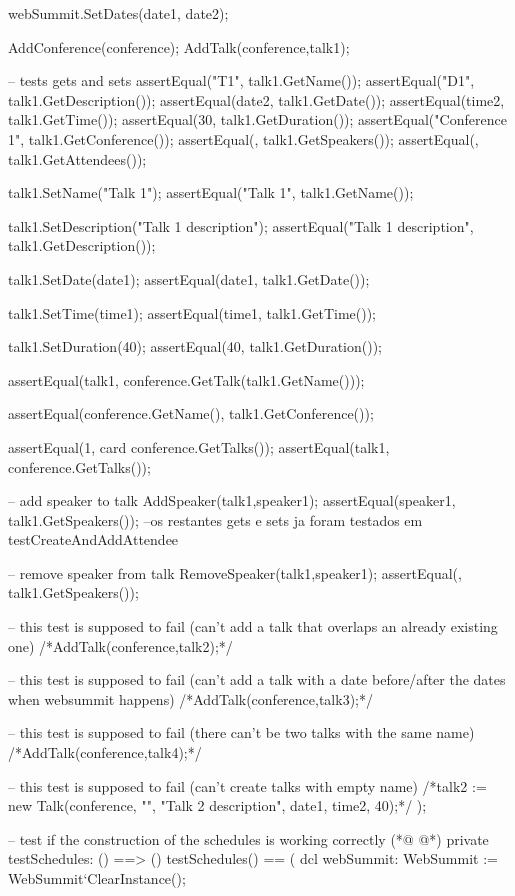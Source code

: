 \begin{vdmpp}[breaklines=true]
  webSummit.SetDates(date1, date2);
  
  AddConference(conference);
  AddTalk(conference,talk1);
 
   -- tests gets and sets
   assertEqual("T1", talk1.GetName());
  assertEqual("D1", talk1.GetDescription());
  assertEqual(date2, talk1.GetDate());
  assertEqual(time2, talk1.GetTime());
  assertEqual(30, talk1.GetDuration());
  assertEqual("Conference 1", talk1.GetConference());
  assertEqual({}, talk1.GetSpeakers());
  assertEqual({}, talk1.GetAttendees());
  
  talk1.SetName("Talk 1");
  assertEqual("Talk 1", talk1.GetName());
  
  talk1.SetDescription("Talk 1 description");
  assertEqual("Talk 1 description", talk1.GetDescription());
  
  talk1.SetDate(date1);
  assertEqual(date1, talk1.GetDate());
  
  talk1.SetTime(time1);
  assertEqual(time1, talk1.GetTime());
  
  talk1.SetDuration(40);
  assertEqual(40, talk1.GetDuration());
  
  assertEqual(talk1, conference.GetTalk(talk1.GetName()));
  
  assertEqual(conference.GetName(), talk1.GetConference());
  
  assertEqual(1, card conference.GetTalks());
  assertEqual({talk1}, conference.GetTalks());
  
  -- add speaker to talk
  AddSpeaker(talk1,speaker1);
  assertEqual({speaker1}, talk1.GetSpeakers());
  --os restantes gets e sets ja foram testados em testCreateAndAddAttendee
  
  -- remove speaker from talk
  RemoveSpeaker(talk1,speaker1);
  assertEqual({}, talk1.GetSpeakers());
  
  -- this test is supposed to fail (can't add a talk that overlaps an already existing one)
  /*AddTalk(conference,talk2);*/
  
  -- this test is supposed to fail (can't add a talk with a date before/after the dates when websummit happens)
  /*AddTalk(conference,talk3);*/
  
  -- this test is supposed to fail (there can't be two talks with the same name)
  /*AddTalk(conference,talk4);*/
  
  -- this test is supposed to fail (can't create talks with empty name)
  /*talk2 := new Talk(conference, "", "Talk 2 description", date1, time2, 40);*/
 );
 
 
 -- test if the construction of the schedules is working correctly
(*@
\label{testSchedules:186}
@*)
 private testSchedules: () ==> ()
 testSchedules() == (
  dcl webSummit: WebSummit := WebSummit`ClearInstance();
  

\end{vdmpp}

